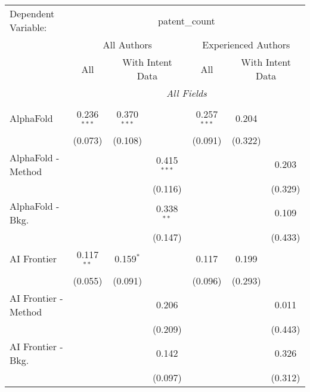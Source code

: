 \begingroup
\centering
\begin{tabular}{lcccccc}
   \tabularnewline \midrule \midrule
   Dependent Variable: & \multicolumn{6}{c}{patent\_count}\\
 & \multicolumn{3}{c}{All Authors} & \multicolumn{3}{c}{Experienced Authors} \\
\cmidrule(lr){2-4} \cmidrule(lr){5-7}
 & \multicolumn{1}{c}{All} & \multicolumn{2}{c}{With Intent Data} & \multicolumn{1}{c}{All} & \multicolumn{2}{c}{With Intent Data} \\
\cmidrule(lr){2-2} \cmidrule(lr){3-4} \cmidrule(lr){5-5} \cmidrule(lr){6-7}
 & \multicolumn{6}{c}{\textit{All Fields}} \\ \\
   AlphaFold            & 0.236$^{***}$ & 0.370$^{***}$ &               & 0.257$^{***}$ & 0.204       &   \\   
                        & (0.073)       & (0.108)       &               & (0.091)       & (0.322)     &   \\   
   AlphaFold - Method   &               &               & 0.415$^{***}$ &               &             & 0.203\\   
                        &               &               & (0.116)       &               &             & (0.329)\\   
   AlphaFold - Bkg.     &               &               & 0.338$^{**}$  &               &             & 0.109\\   
                        &               &               & (0.147)       &               &             & (0.433)\\   
   AI Frontier          & 0.117$^{**}$  & 0.159$^{*}$   &               & 0.117         & 0.199       &   \\   
                        & (0.055)       & (0.091)       &               & (0.096)       & (0.293)     &   \\   
   AI Frontier - Method &               &               & 0.206         &               &             & 0.011\\   
                        &               &               & (0.209)       &               &             & (0.443)\\   
   AI Frontier - Bkg.   &               &               & 0.142         &               &             & 0.326\\   
                        &               &               & (0.097)       &               &             & (0.312)\\   

\end{tabular}
